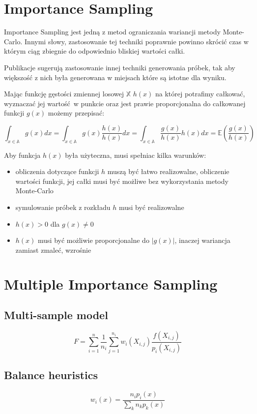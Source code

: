 \documentclass[../main.tex]{subfiles}
\begin{document}
\section{Importance Sampling}

Importance Sampling jest jedną z metod ograniczania wariancji metody
Monte-Carlo. Innymi słowy, zastosowanie tej techniki poprawnie powinno
skrócić czas w którym ciąg zbiegnie do odpowiednio bliskiej wartości całki.

Publikacje \cite{Veach}\cite{MonteCarloAnderson} sugerują zastosowanie innej
techniki generowania próbek, tak aby większość z nich była generowana w
miejsach które są istotne dla wyniku.

Mając funkcję gęstości zmiennej losowej $\mathbb{X}$ $h(x)$ na której potrafimy
całkować, wyznaczać jej wartość w punkcie oraz jest prawie proporcjonalna do
całkowanej funkcji $g(x)$ możemy przepisać:

\[
  \int_{x \in \mathbb{A}} { g(x) dx } =
  \int_{x \in \mathbb{A}} { g(x) \frac{h(x)}{h(x)} dx } =
  \int_{x \in \mathbb{A}} { \frac{g(x)}{h(x)} h(x) dx } =
  \mathbb{E}\left({ \frac{g(x)}{h(x)} }\right)
\]

Aby funkcja $h(x)$ była użyteczna, musi spełniac kilka warunków:

\begin{itemize}

  \item obliczenia dotyczące funkcji $h$ muszą być łatwo realizowalne,
    obliczenie wartości funkcji, jej całki musi być możliwe bez wykorzystania
    metody Monte-Carlo

  \item symulowanie próbek z rozkładu $h$ musi być realizowalne

  \item $h(x) > 0$ dla $g(x) \neq 0$

  \item $h(x)$ musi być możliwie proporcjonalne do $|g(x)|$, inaczej wariancja
    zamiast zmaleć, wzrośnie

\end{itemize}

\section{Multiple Importance Sampling}

\cite{pbrt}

\subsection{Multi-sample model}

\[
  F = \sum_{i=1}^{n} \frac{1}{n_i} \sum_{j=1}^{n_i} w_{i}(X_{i,j}) \frac{
    f(X_{i,j})
  }{
    p_{i}(X_{i,j})
  }
\]

\subsection{Balance heuristics}

\[
  w_{i}(x) = \frac{
    n_{i} p_{i}(x)
  }{
    \sum_{k} {
      n_{k} p_{k}(x)
    }
  }
\]
\end{document}

